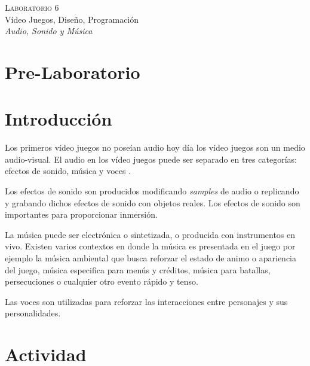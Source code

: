 \begin{center}
\textsc{\Large Laboratorio 6}~\\
{\large Vídeo Juegos, Diseño, Programación}~\\
\emph{Audio, Sonido y Música}
\end{center}

\section{Pre-Laboratorio}

\section{Introducción}
Los primeros vídeo juegos no poseían audio hoy día los vídeo juegos son un medio audio-visual. El audio en los vídeo juegos puede ser separado en tres categorías: efectos de sonido, música y voces \cite{erikgamedevelopment}\cite{valve_audio}.

Los efectos de sonido son producidos modificando \emph{samples} de audio o replicando y grabando dichos efectos de sonido con objetos reales. Los efectos de sonido son importantes para proporcionar inmersión. 

La música puede ser electrónica o sintetizada, o producida con instrumentos en vivo. Existen varios contextos en donde la música es presentada en el juego por ejemplo la música ambiental que busca reforzar el estado de animo o apariencia del juego, música especifica para menús y créditos, música para batallas, persecuciones o cualquier otro evento rápido y tenso.

Las voces son utilizadas para reforzar las interacciones entre personajes y sus personalidades.

\section{Actividad}
